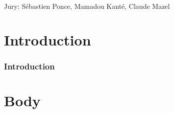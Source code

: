 \documentclass{beamer}
\begin{document}
\begin{frame}
    \maketitle

    Jury: Sébastien Ponce, Mamadou Kanté, Claude Mazel
\end{frame}


\part{Introduction}
\section*{Introduction}

\begin{frame}
    \centering
\end{frame}


\part{Body}
\begin{frame}
    \tableofcontents
\end{frame}
\end{document}
